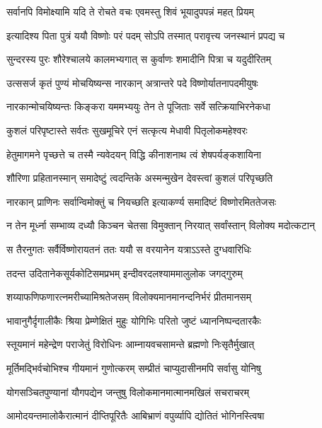 \twolineshloka
{सर्वानपि विमोक्ष्यामि यदि ते रोचते वचः}
{एवमस्तु शिवं भूयादुपपन्नं महत् प्रियम्} %

\twolineshloka
{इत्यादिश्य पिता पुत्रं ययौ विष्णोः परं पदम्}
{सोऽपि तस्मात् परावृत्त्य जनस्थानं प्रपद्य च} %

\twolineshloka
{सुन्दरस्य पुरः शौरेश्चालये कालमभ्यगात्}
{स कुर्वाणः शमादीनि पित्रा च यदुदीरितम्} %

\twolineshloka
{उत्ससर्ज कृतं पुण्यं मोचयिष्यन्स नारकान्}
{अत्रान्तरे पदे विष्णोर्यातनापदमीयुषः} %

\twolineshloka
{नारकान्मोचयिष्यन्तः किङ्करा यममभ्ययुः}
{तेन ते पूजिताः सर्वे सत्क्रियाभिरनेकधा} %

\twolineshloka
{कुशलं परिपृष्टास्ते सर्वतः सुखमूचिरे}
{एनं सत्कृत्य मेधावी पितृलोकमहेश्वरः} %

\twolineshloka
{हेतुमागमने पृच्छत्ते च तस्मै न्यवेदयन्}
{विद्धि कीनाशनाथ त्वं शेषपर्यङ्कशायिना} %

\twolineshloka
{शौरिणा प्रहितानस्मान् समादेष्टुं त्वदन्तिके}
{अस्मन्मुखेन देवस्त्वां कुशलं परिपृच्छति} %

\twolineshloka
{नारकान् प्राणिनः सर्वान्विमोक्तुं च नियच्छति}
{इत्याकर्ण्य समादिष्टं विष्णोरमिततेजसः} %

\twolineshloka
{न तेन मूर्ध्ना सम्भाव्य दध्यौ किञ्चन चेतसा}
{विमुक्तान् निरयात् सर्वांस्तान् विलोक्य मदोत्कटान्} %

\twolineshloka
{स तैरनुगतः सर्वैर्विष्णोरायतनं ततः}
{ययौ स वरयानेन यत्राऽऽस्ते दुग्धवारिधिः} %

\twolineshloka
{तदन्त उदितानेकसूर्यकोटिसमप्रभम्}
{इन्दीवरदलश्याममालुलोक जगद्गुरुम्} %

\twolineshloka
{शय्याफणिफणारत्नमरीच्यामिश्रतेजसम्}
{विलोक्यमानमानन्दनिर्भरं प्रीतमानसम्} %

\twolineshloka
{भावानुगैर्दृगालीकैः श्रिया प्रेम्णेक्षितं मुहुः}
{योगिभिः परितो जुष्टं ध्याननिष्पन्दतारकैः} %

\twolineshloka
{स्तूयमानं महेन्द्रेण पराजेतुं विरोधिनः}
{आम्नायवचसामन्ते ब्रह्मणो निःसृतैर्मुखात्} %

\twolineshloka
{मूर्तिमद्भिर्वचोभिश्च गीयमानं गुणोत्करम्}
{सम्प्रीतं चाप्युदासीनमपि सर्वासु योनिषु} %

\twolineshloka
{योगसञ्चितपुण्यानां यौगपद्येन जन्तुषु}
{विलोकमानमात्मानमखिलं सचराचरम्} %

\twolineshloka
{आमोदयन्तमालोकैरात्मानं दीप्तिपूरितैः}
{आबिभ्राणं वपुर्व्यापि द्योतितं भोगिनस्त्विषा} %


